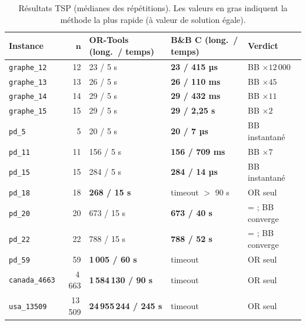 \documentclass[11pt,a4paper]{article}
\begin{document}
\begin{table}[!htbp]
\centering
\small
\setlength{\tabcolsep}{5pt}
\begin{tabular}{lrlll}
\toprule
\textbf{Instance} & $\boldsymbol{n}$ & \textbf{OR-Tools (long.\ / temps)} & \textbf{B\&B C (long.\ / temps)} & \textbf{Verdict} \\
\midrule
\texttt{graphe\_12}    & 12     & 23 / 5 s                       & \textbf{23 / 415 µs}          & BB $\times 12\,000$ \\
\texttt{graphe\_13}    & 13     & 26 / 5 s                       & \textbf{26 / 110 ms}          & BB $\times 45$ \\
\texttt{graphe\_14}    & 14     & 29 / 5 s                       & \textbf{29 / 432 ms}          & BB $\times 11$ \\
\texttt{graphe\_15}    & 15     & 29 / 5 s                       & \textbf{29 / 2{,}25 s}        & BB $\times 2$ \\
\texttt{pd\_5}         & 5      & 20 / 5 s                       & \textbf{20 / 7 µs}            & BB instantané \\
\texttt{pd\_11}        & 11     & 156 / 5 s                      & \textbf{156 / 709 ms}         & BB $\times 7$ \\
\texttt{pd\_15}        & 15     & 284 / 5 s                      & \textbf{284 / 14 µs}          & BB instantané \\
\texttt{pd\_18}        & 18     & \textbf{268 / 15 s}            & timeout $>$ 90 s              & OR seul \\
\texttt{pd\_20}        & 20     & 673 / 15 s                     & \textbf{673 / 40 s}           & = ; BB converge \\
\texttt{pd\_22}        & 22     & 788 / 15 s                     & \textbf{788 / 52 s}           & = ; BB converge \\
\texttt{pd\_59}        & 59     & \textbf{1\,005 / 60 s}         & timeout                       & OR seul \\
\texttt{canada\_4663}  & 4\,663 & \textbf{1\,584\,130 / 90 s}    & timeout                       & OR seul \\
\texttt{usa\_13509}    & 13\,509 & \textbf{24\,955\,244 / 245 s} & timeout                       & OR seul \\
\bottomrule
\end{tabular}
\caption{Résultats TSP (médianes des répétitions). Les valeurs en gras indiquent la méthode la plus rapide (à valeur de solution égale).}
\label{tab:tsp}
\end{table}
\end{document}
